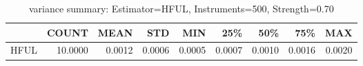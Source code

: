 \begin{table}[ht]
\centering
\caption{variance summary: Estimator=HFUL, Instruments=500, Strength=0.70}
\begin{tabular}{lrrrrrrrr}
\toprule
 & COUNT & MEAN & STD & MIN & 25\% & 50\% & 75\% & MAX \\
\midrule
HFUL & 10.0000 & 0.0012 & 0.0006 & 0.0005 & 0.0007 & 0.0010 & 0.0016 & 0.0020 \\
\bottomrule
\end{tabular}
\end{table}
